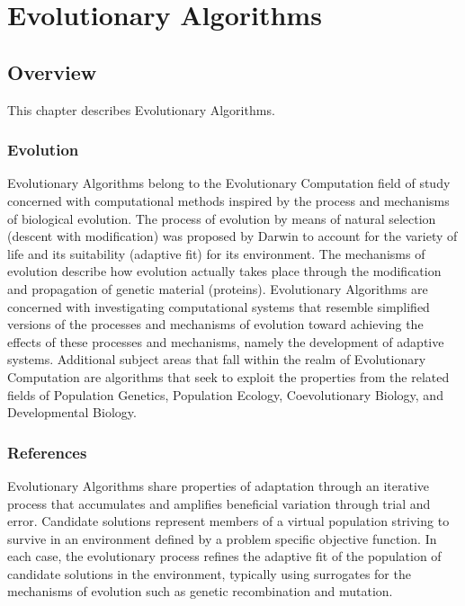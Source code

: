 

\chapter{Evolutionary Algorithms}
\label{ch:evolutionary}
\renewcommand{\bibsection}{\subsection{\bibname}}
\begin{bibunit}

\section{Overview}
This chapter describes Evolutionary Algorithms.

\subsection{Evolution}
Evolutionary Algorithms belong to the Evolutionary Computation field of study concerned with computational methods inspired by the process and mechanisms of biological evolution. 
The process of evolution by means of natural selection (descent with modification) was proposed by Darwin to account for the variety of life and its suitability (adaptive fit) for its environment. The mechanisms of evolution describe how evolution actually takes place through the modification and propagation of genetic material (proteins). 
Evolutionary Algorithms are concerned with investigating computational systems that resemble simplified versions of the processes and mechanisms of evolution toward achieving the effects of these processes and mechanisms, namely the development of adaptive systems.
Additional subject areas that fall within the realm of Evolutionary Computation are algorithms that seek to exploit the properties from the related fields of Population Genetics, Population Ecology, Coevolutionary Biology, and Developmental Biology. 

\subsection{References}
Evolutionary Algorithms share properties of adaptation through an iterative process that accumulates and amplifies beneficial variation through trial and error. Candidate solutions represent members of a virtual population striving to survive in an environment defined by a problem specific objective function. In each case, the evolutionary process refines the adaptive fit of the population of candidate solutions in the environment, typically using surrogates for the mechanisms of evolution such as genetic recombination and mutation.


\end{bibunit}

